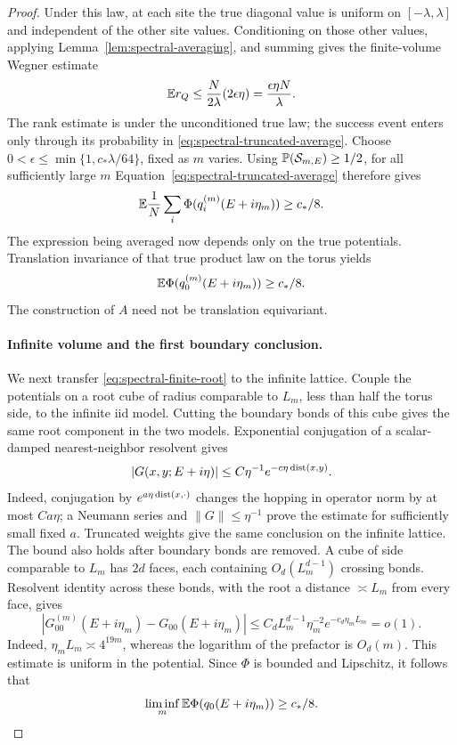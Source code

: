 \begin{proof}
Under this law, at each site the true diagonal value is uniform on
$[-\lambda,\lambda]$ and independent of the other site values.
Conditioning on those other values, applying
Lemma~\ref{lem:spectral-averaging}, and summing gives the finite-volume
Wegner estimate~\cite{Wegner1981}
\[
 \mathbb E r_Q\le\frac{N}{2\lambda}(2\epsilon\eta)
         =\frac{\epsilon\eta N}{\lambda}.
\]
The rank estimate is under the unconditioned true law; the success
event enters only through its probability in
\eqref{eq:spectral-truncated-average}. Choose
$0<\epsilon\le\min\{1,c_*\lambda/64\}$, fixed as $m$ varies.
Using $\mathbb P(\mathcal S_{m,E})\ge1/2$, for all sufficiently large
$m$ Equation~\eqref{eq:spectral-truncated-average}
therefore gives
\[
 \mathbb E\frac1N\sum_i\Phi(q_i^{(m)}(E+i\eta_m))\ge c_*/8.
\]
The expression being averaged now depends only on the true
potentials. Translation invariance of that true product law
on the torus yields
\begin{equation}\label{eq:spectral-finite-root}
 \mathbb E\Phi(q_0^{(m)}(E+i\eta_m))\ge c_*/8.
\end{equation}
The construction of $A$ need not be translation equivariant.

\paragraph{Infinite volume and the first boundary conclusion.}
We next transfer \eqref{eq:spectral-finite-root} to the infinite
lattice. Couple the potentials on a root cube of radius comparable
to $L_m$, less than half the torus side, to the infinite iid model.
Cutting the boundary bonds of this cube gives the same root
component in the two models. Exponential conjugation of a
scalar-damped nearest-neighbor resolvent gives
\[
 |G(x,y;E+i\eta)|\le C\eta^{-1}e^{-c\eta\operatorname{dist}(x,y)}.
\]
Indeed, conjugation by $e^{a\eta\operatorname{dist}(x,\cdot)}$ changes the
hopping in operator norm by at most $Ca\eta$; a Neumann series
and $\|G\|\le\eta^{-1}$ prove the estimate for sufficiently small
fixed $a$. Truncated weights give the same conclusion on the
infinite lattice. The bound also holds after boundary bonds are
removed. A cube of side comparable to $L_m$ has $2d$ faces,
each containing $O_d(L_m^{d-1})$ crossing bonds. Resolvent
identity across these bonds, with the root a distance
$\asymp L_m$ from every face, gives
\begin{equation}\label{eq:spectral-volume-comparison}
 |G_{00}^{(m)}(E+i\eta_m)-G_{00}(E+i\eta_m)|
 \le C_d L_m^{d-1}\eta_m^{-2}e^{-c_d\eta_mL_m}=o(1).
\end{equation}
Indeed, $\eta_mL_m\asymp4^{19m}$, whereas the logarithm of
the prefactor is $O_d(m)$.
This estimate is uniform in the potential. Since $\Phi$ is bounded
and Lipschitz, it follows that
\begin{equation}\label{eq:spectral-infinite-root}
 \liminf_m\mathbb E\Phi(q_0(E+i\eta_m))\ge c_*/8.
\end{equation}


\end{proof}
